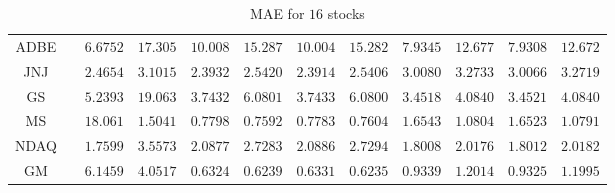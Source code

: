 \documentclass[12pt, A4]{article}
\begin{document}
\begin{landscape}
\begin{table}[H]
\begin{center}
\begin{tabular}{| c | c | c | c | c | c | c | c | c | c | c | c |}
				ADBE & \cellcolor{blue!25}  \boldmath{$3.0786$} & $6.6752$ & $17.305$ & $10.008$ & $15.287$ & $10.004$ & $15.282$ & $7.9345$ & $12.677$ & $7.9308$ & $12.672$\\ \cline{1-12}
				JNJ & \cellcolor{blue!25}  \boldmath{$1.0399$} & $2.4654$ & $3.1015$ & $2.3932$ & $2.5420$ & $2.3914$ & $2.5406$ & $3.0080$ & $3.2733$ & $3.0066$ & $3.2719$\\ \cline{1-12}
				GS & \cellcolor{blue!25}  \boldmath{$2.7245$} & $5.2393$ & $19.063$ & $3.7432$ & $6.0801$ & $3.7433$ & $6.0800$ & $3.4518$ & $4.0840$ & $3.4521$ & $4.0840$\\ \cline{1-12}
				MS & \cellcolor{blue!25}  \boldmath{$0.7218$} & $18.061$ & $1.5041$ & $0.7798$ & $0.7592$ & $0.7783$ & $0.7604$ & $1.6543$ & $1.0804$ & $1.6523$ & $1.0791$\\ \cline{1-12}
				NDAQ & \cellcolor{blue!25}  \boldmath{$1.7228$} & $1.7599$ & $3.5573$ & $2.0877$ & $2.7283$ & $2.0886$ & $2.7294$ & $1.8008$ & $2.0176$ & $1.8012$ & $2.0182$\\ \cline{1-12}
				GM & \cellcolor{blue!25}  \boldmath{$0.6062$} & $6.1459$ & $4.0517$ & $0.6324$ & $0.6239$ & $0.6331$ & $0.6235$ & $0.9339$ & $1.2014$ & $0.9325$ & $1.1995$\\ \cline{1-12}
			\end{tabular}
			\caption{MAE for $16$ stocks} \label{stocks MAE_results}
		\end{center}
	\end{table}
\end{landscape}
\end{document}
